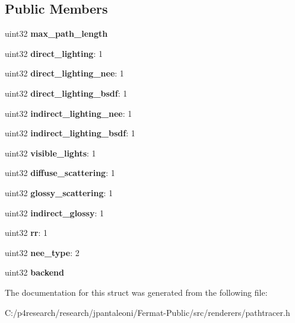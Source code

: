 \subsection*{Public Members}
\begin{DoxyCompactItemize}
\item 
\mbox{\label{struct_p_t_options_a3d37d7b8d1a4f1e34a6681f5f61998e3}} 
uint32 {\bfseries max\+\_\+path\+\_\+length}
\item 
\mbox{\label{struct_p_t_options_a8fef4cb292f21c1d4edd25fe013e6b37}} 
uint32 {\bfseries direct\+\_\+lighting}\+: 1
\item 
\mbox{\label{struct_p_t_options_ac123d37c0af7882dd81f0049ab53bd29}} 
uint32 {\bfseries direct\+\_\+lighting\+\_\+nee}\+: 1
\item 
\mbox{\label{struct_p_t_options_af9501deb6af7ca48010d0d2aba029e16}} 
uint32 {\bfseries direct\+\_\+lighting\+\_\+bsdf}\+: 1
\item 
\mbox{\label{struct_p_t_options_a543db9fbe2c32c451cdbeb742ffcb4c9}} 
uint32 {\bfseries indirect\+\_\+lighting\+\_\+nee}\+: 1
\item 
\mbox{\label{struct_p_t_options_a9287a9f09d42685a8e372085ff76af42}} 
uint32 {\bfseries indirect\+\_\+lighting\+\_\+bsdf}\+: 1
\item 
\mbox{\label{struct_p_t_options_a88a3d72431cf639e9951ed76a14ee7ce}} 
uint32 {\bfseries visible\+\_\+lights}\+: 1
\item 
\mbox{\label{struct_p_t_options_a39f407a0e7aad6d4d40926a91547f683}} 
uint32 {\bfseries diffuse\+\_\+scattering}\+: 1
\item 
\mbox{\label{struct_p_t_options_a395036f1b033dd3d3c872f8f788e6e3d}} 
uint32 {\bfseries glossy\+\_\+scattering}\+: 1
\item 
\mbox{\label{struct_p_t_options_a2c06a279aae8a80f240e26ffbe371866}} 
uint32 {\bfseries indirect\+\_\+glossy}\+: 1
\item 
\mbox{\label{struct_p_t_options_ad073e9c25b7c90c50d1c7c568abc2aa6}} 
uint32 {\bfseries rr}\+: 1
\item 
\mbox{\label{struct_p_t_options_a8add8a2bb7f9203bcc7ed8bbccec241d}} 
uint32 {\bfseries nee\+\_\+type}\+: 2
\item 
\mbox{\label{struct_p_t_options_a09e63fcdda25ce8812e4bc3221b04010}} 
uint32 {\bfseries backend}
\end{DoxyCompactItemize}


The documentation for this struct was generated from the following file\+:\begin{DoxyCompactItemize}
\item 
C\+:/p4research/research/jpantaleoni/\+Fermat-\/\+Public/src/renderers/pathtracer.\+h\end{DoxyCompactItemize}
